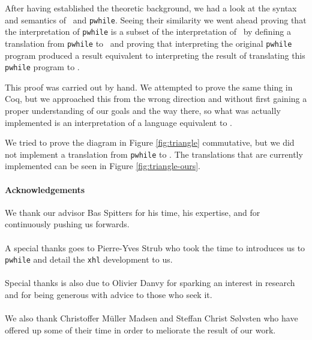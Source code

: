 \documentclass[11pt, leqno, titlepage]{article}
\theoremstyle{definition}
\begin{document}
After having established the theoretic background, we had a look at the syntax and
semantics of \rml\ and \texttt{pwhile}. Seeing their similarity we went ahead proving
that the interpretation of \texttt{pwhile} is a subset of the interpretation of
\rml\ by defining a translation from \texttt{pwhile} to \rml\ and proving that
interpreting the original \texttt{pwhile} program produced a result equivalent to
interpreting the result of translating this \texttt{pwhile} program to \rml.

This proof was carried out by hand. We attempted to prove the same thing in Coq, but
we approached this from the wrong direction and without first gaining a proper
understanding of our goals and the way there, so what was actually implemented is an
interpretation of a language equivalent to \rml.

We tried to prove the diagram in Figure \ref{fig:triangle} commutative, but we did
not implement a translation from \texttt{pwhile} to \rml. The translations that are
currently implemented can be seen in Figure \ref{fig:triangle-ours}.


\paragraph{Acknowledgements}We thank our advisor Bas Spitters for his time, his
expertise, and for continuously pushing us forwards.
\\ \\
A special thanks goes to Pierre-Yves Strub who took the time to introduces us to
\texttt{pwhile} and detail the \texttt{xhl} development to us.
\\ \\
Special thanks is also due to Olivier Danvy for sparking an interest in research and
for being generous with advice to those who seek it. 
\\ \\
We also thank Christoffer Müller Madsen and Steffan Christ Sølvsten who have offered
up some of their time in order to meliorate the result of our work. 

\newpage


\end{document}
